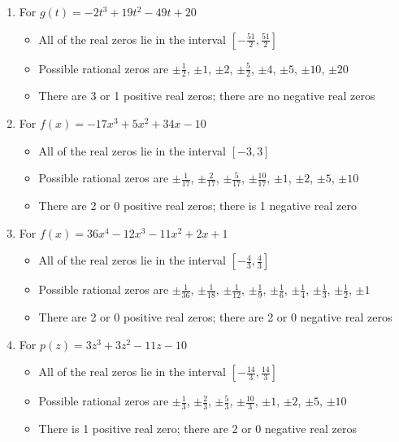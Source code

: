 \documentclass{ximera}
\begin{document}
\begin{enumerate}
\item For   $g(t) = -2t^{3} + 19t^{2} - 49t + 20$
\begin{itemize}
\item  All of the real zeros lie in the interval $\left[-\frac{51}{2},\frac{51}{2} \right]$
\item  Possible rational zeros are  $\pm \frac{1}{2}$, $\pm 1$, $\pm 2$, $\pm \frac{5}{2}$, $\pm 4$, $\pm 5$, $\pm 10$, $\pm 20$ 
\item  There are 3 or 1 positive real zeros;  there are no negative real zeros
\end{itemize}

\item For   $f(x) = -17x^{3} + 5x^{2} + 34x - 10$
\begin{itemize}
\item  All of the real zeros lie in the interval $[-3,3]$
\item  Possible rational zeros are $\pm \frac{1}{17}$, $\pm \frac{2}{17}$, $\pm \frac{5}{17}$, $\pm \frac{10}{17}$, $\pm 1$, $\pm 2$, $\pm 5$, $\pm 10$
\item  There are 2 or 0 positive real zeros;  there is 1 negative real zero
\end{itemize}

\item For   $f(x) = 36x^{4} - 12x^{3} - 11x^{2} + 2x + 1$
\begin{itemize}
\item  All of the real zeros lie in the interval $\left[-\frac{4}{3},\frac{4}{3}\right]$
\item  Possible rational zeros are $\pm \frac{1}{36}$, $\pm \frac{1}{18}$, $\pm \frac{1}{12}$, $\pm \frac{1}{9}$, $\pm \frac{1}{6}$, $\pm \frac{1}{4}$, $\pm \frac{1}{3}$, $\pm \frac{1}{2}$, $\pm 1$
\item  There are 2 or 0 positive real zeros;  there are 2 or 0 negative real zeros
\end{itemize}

\item For   $p(z) = 3z^{3} + 3z^{2} - 11z - 10$
\begin{itemize}
\item  All of the real zeros lie in the interval $\left[-\frac{14}{3},\frac{14}{3}\right]$
\item  Possible rational zeros are $\pm \frac{1}{3}$, $\pm \frac{2}{3}$, $\pm \frac{5}{3}$, $\pm \frac{10}{3}$, $\pm 1$, $\pm 2$, $\pm 5$, $\pm 10$
\item  There is 1 positive real zero;  there are 2 or 0 negative real zeros
\end{itemize}


\end{enumerate}
\end{document}
